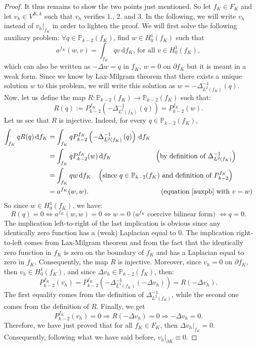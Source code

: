 \begin{proof}
It thus remains to show the two points just mentioned. So let $f_K\in F_K$ and let $v_h\in V^{K,k}$ such that $v_h$ verifies $1.$, $2.$ and $3.$ In the following, we will write $v_h$ instead of $v_h|_{f_K}$ in order to lighten the proof. We will first solve the following auxiliary problem: $\forall q\in \mathbb{P}_{k-2}(f_K)$, find $w\in H_0^1(f_K)$ such that \begin{equation}\label{auxpb}
a^{f_K}(w,v)=\int_{f_K}qv \,\mathrm{d}f_K\text{, for all } v\in H_0^1(f_K),
\end{equation}
which can also be written as $-\Delta w=q$ in $f_K$, $w=0$ on $\partial f_K$ but it is meant in a weak form. Since we know by Lax-Milgram theorem that there exists a unique solution $w$ to this problem, we will write this solution as $w=-\Delta_{L^2(f_K)}^{-1}(q)$. Now, let us define the map $R:\mathbb{P}_{k-2}(f_K)\rightarrow\mathbb{P}_{k-2}(f_K)$ such that:
$$R(q) := P_{k-2}^{f_K}\left(-\Delta_{L^2(f_K)}^{-1}\left( q\right) \right)=P_{k-2}^{f_K}(w).$$
Let us see that $R$ is injective. Indeed, for every $q\in \mathbb{P}_{k-2}(f_K)$, 
\begin{align*}
\int_{f_K} qR(q)\, \mathrm{d}f_K &= \int_{f_K} qP_{k-2}^{f_K}\left(-\Delta_{L^2(f_K)}^{-1} \left(q\right)\right)\,\mathrm{d}f_K\\
&=\int_{f_K} qP_{k-2}^{f_K}(w)\, \mathrm{d}f_K \hspace{2.2cm}\left(\text{by definition of }\Delta_{L^2(f_K)}^{-1}\right)\\
&=\int_{f_K} qw\,\mathrm{d}{f_K}\hspace{0.3cm}\left(\text{since }q\in\mathbb{P}_{k-2}(f_K)\text{ and definition of }P_{k-2}^{f_K}\right)\\
&= a^{f_K}(w,w).\hspace{3.7cm} \text{(equation \ref{auxpb} with }v=w)
\end{align*}
So since $w\in H_0^1(f_K)$, we have:
$$R(q)=0 \Leftrightarrow a^{f_K}(w,w)=0 \Leftrightarrow w=0 \text{ (}a^{f_K}\text{ coercive bilinear form) }\Leftrightarrow q=0.$$
The implication left-to-right of the last implication is obvious since any identically zero function has a (weak) Laplacian equal to $0$. The implication right-to-left comes from Lax-Milgram theorem and from the fact that the identically zero function in $f_K$ is zero on the boundary of $f_K$ and has a Laplacian equal to zero in $f_K$. Consequently, the map $R$ is injective. 
Moreover, since $v_h=0$ on $\partial f_K$, then $v_h\in H_0^1(f_K)$, and since $\Delta v_h \in \mathbb{P}_{k-2}(f_K)$, then:
$$P_{k-2}^{f_K}(v_h)=P_{k-2}^{f_K}\left(-\Delta_{L^2(f_K)}^{-1}
\left(-\Delta v_h\right)\right) = R\left(-\Delta v_h\right).$$
The first equality comes from the definition of $\Delta_{L^2(f_K)}^{-1}$, while the second one comes from the definition of $R$. Finally, we get
$$P_{k-2}^{f_K}(v_h)=0 \Rightarrow R\left(-\Delta v_h\right) = 0 \Rightarrow -\Delta v_h = 0.$$
Therefore, we have just proved that for all $f_K\in F_K$, then $\Delta v_h|_{f_K}=0$. Consequently, following what we have said before, $v_h|_{\partial K} \equiv 0$. 


\end{proof}
